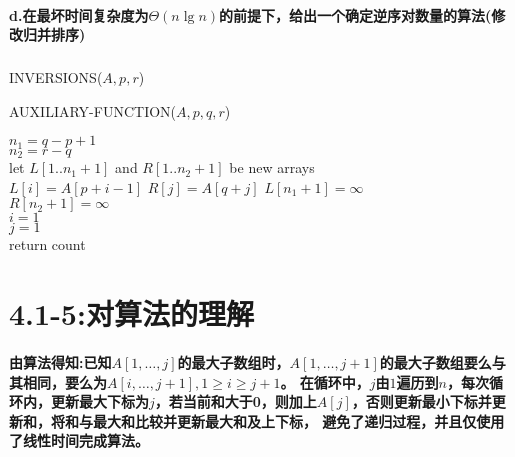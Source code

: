 \documentclass[a4paper]{article}
\begin{document}
\paragraph{d.在最坏时间复杂度为$\Theta(n \lg n)$的前提下，给出一个确定逆序对数量的算法(修改归并排序)}
\subparagraph{}
\begin{algorithm}
    \caption{INVERSIONS($A,p,r$)}
\end{algorithm}
\begin{algorithm}
    \caption{AUXILIARY-FUNCTION($A,p,q,r$)}
    $n_{1}=q-p+1$\\
    $n_{2}=r-q$\\
    let $L[1..n_{1}+1]$ and $R[1..n_{2}+1]$ be new arrays\\
     {
    $L[i]=A[p+i-1]$
    }
     {
    $R[j]=A[q+j]$
    }
    $L[n_{1}+1]=\infty$\\
    $R[n_{2}+1]=\infty$\\
    $i=1$\\
    $j=1$\\
     {
    \BlankLine
    }
    return  count
\end{algorithm}
\section{4.1-5:对算法的理解}
\paragraph{
    由算法得知:已知$A[1,\dots,j]$的最大子数组时，$A[1,\dots,j+1]$的最大子数组要么与其相同，要么为$A[i,\dots,j+1],1\geq i \geq j+1$。
    在循环中，$j$由$1$遍历到$n$，每次循环内，更新最大下标为$j$，若当前和大于0，则加上$A[j]$，否则更新最小下标并更新和，将和与最大和比较并更新最大和及上下标，
    避免了递归过程，并且仅使用了线性时间完成算法。
    }
\end{document}
